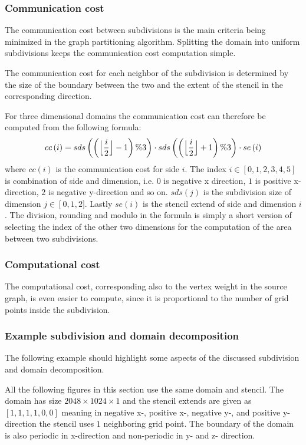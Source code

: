 \subsubsection{Communication cost}
The communication cost between subdivisions is the main criteria being minimized in the graph partitioning algorithm.
Splitting the domain into uniform subdivisions keeps the communication cost computation simple.

The communication cost for each neighbor of the subdivision is determined by the size of the boundary between the two and the extent of the stencil in the corresponding direction.

For three dimensional domains the communication cost can therefore be computed from the following formula:
\begin{equation}
cc\left(i\right) = sds\left(\left(\floor[\Big]{\frac{i}{2}} - 1\right) \% 3 \right) \cdot sds\left(\left(\floor[\Big]{\frac{i}{2}} + 1\right) \% 3 \right) \cdot se\left(i\right)
\end{equation}
where $cc\left(i\right)$ is the communication cost for side $i$.
The index $i \in \left[0, 1, 2, 3, 4, 5\right]$ is combination of side and dimension, i.e. $0$ is negative x direction, $1$ is positive x-direction, $2$ is negative y-direction and so on.
$sds\left(j\right)$ is the subdivision size of dimension $j \in \left[0,1,2]$.
Lastly $se\left(i\right)$ is the stencil extend of side and dimension $i$.
The division, rounding and modulo in the formula is simply a short version of selecting the index of the other two dimensions for the computation of the area between two subdivisions.

\subsubsection{Computational cost}

The computational cost, corresponding also to the vertex weight in the source graph, is even easier to compute, since it is proportional to the number of grid points inside the subdivision.

\subsubsection{Example subdivision and domain decomposition}
The following example should highlight some aspects of the discussed subdivision and domain decomposition.

All the following figures in this section use the same domain and stencil.
The domain has size $2048 \times 1024 \times 1$ and the stencil extends are given as $\left[1, 1, 1, 1, 0, 0\right]$ meaning in negative x-, positive x-, negative y-, and positive y-direction the stencil uses $1$ neighboring grid point.
The boundary of the domain is also periodic in x-direction and non-periodic in y- and z- direction.

